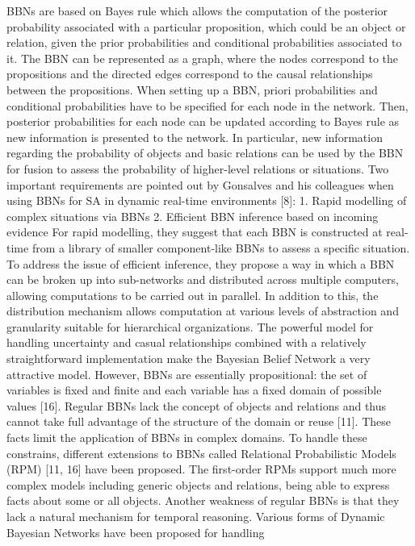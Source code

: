 \documentclass[a4paper,11pt,twoside]{StyleThese}
\begin{document}
BBNs are based on Bayes rule which allows the computation of the posterior probability
associated with a particular proposition, which could be an object or relation, given the prior
probabilities and conditional probabilities associated to it.
The BBN can be represented as a graph, where the nodes correspond to the propositions and
the directed edges correspond to the causal relationships between the propositions. When
setting up a BBN, priori probabilities and conditional probabilities have to be specified for
each node in the network. Then, posterior probabilities for each node can be updated
according to Bayes rule as new information is presented to the network. In particular, new
information regarding the probability of objects and basic relations can be used by the BBN
for fusion to assess the probability of higher-level relations or situations.
Two important requirements are pointed out by Gonsalves and his colleagues when using
BBNs for SA in dynamic real-time environments [8]:
1. Rapid modelling of complex situations via BBNs
2. Efficient BBN inference based on incoming evidence
For rapid modelling, they suggest that each BBN is constructed at real-time from a library of
smaller component-like BBNs to assess a specific situation. To address the issue of efficient
inference, they propose a way in which a BBN can be broken up into sub-networks and
distributed across multiple computers, allowing computations to be carried out in parallel. In
addition to this, the distribution mechanism allows computation at various levels of
abstraction and granularity suitable for hierarchical organizations.
The powerful model for handling uncertainty and casual relationships combined with a
relatively straightforward implementation make the Bayesian Belief Network a very
attractive model. However, BBNs are essentially propositional: the set of variables is fixed
and finite and each variable has a fixed domain of possible values [16]. Regular BBNs lack
the concept of objects and relations and thus cannot take full advantage of the structure of
the domain or reuse [11]. These facts limit the application of BBNs in complex domains. To
handle these constrains, different extensions to BBNs called Relational Probabilistic Models
(RPM) [11, 16] have been proposed. The first-order RPMs support much more complex
models including generic objects and relations, being able to express facts about some or all
objects.
Another weakness of regular BBNs is that they lack a natural mechanism for temporal
reasoning. Various forms of Dynamic Bayesian Networks have been proposed for handling
\end{document}
